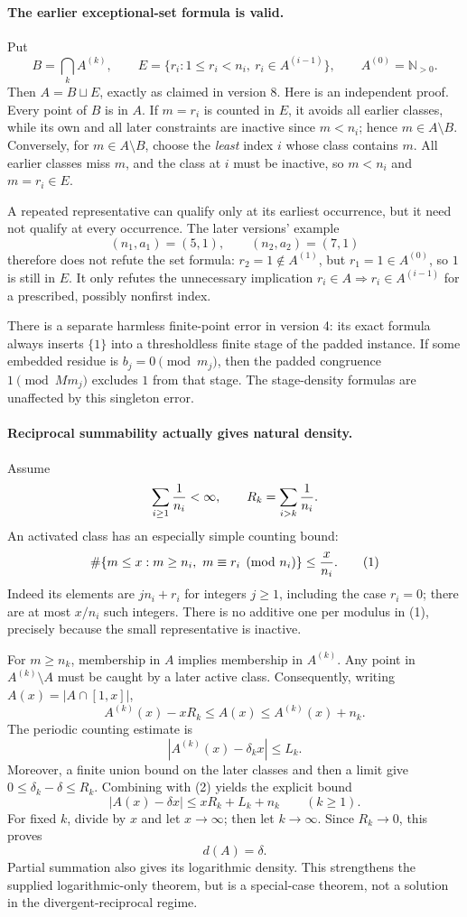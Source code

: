 \paragraph{The earlier exceptional-set formula is valid.}
Put
\[
 B=\bigcap_k A^{(k)},\qquad
 E=\{r_i:1\le r_i<n_i,\ r_i\in A^{(i-1)}\},\qquad A^{(0)}=\mathbb N_{>0}.
\]
Then $A=B\sqcup E$, exactly as claimed in version 8. Here is an independent proof. Every point of $B$ is in $A$. If $m=r_i$ is counted in $E$, it avoids all earlier classes, while its own and all later constraints are inactive since $m<n_i$; hence $m\in A\setminus B$. Conversely, for $m\in A\setminus B$, choose the \emph{least} index $i$ whose class contains $m$. All earlier classes miss $m$, and the class at $i$ must be inactive, so $m<n_i$ and $m=r_i\in E$.

A repeated representative can qualify only at its earliest occurrence, but it need not qualify at every occurrence. The later versions' example
\[
(n_1,a_1)=(5,1),\qquad(n_2,a_2)=(7,1)
\]
therefore does not refute the set formula: $r_2=1\notin A^{(1)}$, but $r_1=1\in A^{(0)}$, so $1$ is still in $E$. It only refutes the unnecessary implication $r_i\in A\Rightarrow r_i\in A^{(i-1)}$ for a prescribed, possibly nonfirst index.

There is a separate harmless finite-point error in version 4: its exact formula always inserts $\{1\}$ into a thresholdless finite stage of the padded instance. If some embedded residue is $b_j=0\pmod{m_j}$, then the padded congruence $1\pmod{Mm_j}$ excludes $1$ from that stage. The stage-density formulas are unaffected by this singleton error.

\paragraph{Reciprocal summability actually gives natural density.}
Assume
\[
 \sum_{i\ge1}{1\over n_i}<\infty,\qquad R_k=\sum_{i>k}{1\over n_i}.
\]
An activated class has an especially simple counting bound:
\[
\#\{m\le x:m\ge n_i,\ m\equiv r_i\pmod{n_i}\}
\le {x\over n_i}. \tag{1}
\]
Indeed its elements are $jn_i+r_i$ for integers $j\ge1$, including the case $r_i=0$; there are at most $x/n_i$ such integers. There is no additive one per modulus in (1), precisely because the small representative is inactive.

For $m\ge n_k$, membership in $A$ implies membership in $A^{(k)}$. Any point in $A^{(k)}\setminus A$ must be caught by a later active class. Consequently, writing $A(x)=|A\cap[1,x]|$,
\[
 A^{(k)}(x)-xR_k\le A(x)\le A^{(k)}(x)+n_k. \tag{2}
\]
The periodic counting estimate is
\[
 |A^{(k)}(x)-\delta_kx|\le L_k.
\]
Moreover, a finite union bound on the later classes and then a limit give $0\le\delta_k-\delta\le R_k$. Combining with (2) yields the explicit bound
\[
 \boxed{|A(x)-\delta x|\le xR_k+L_k+n_k\qquad(k\ge1).} \tag{3}
\]
For fixed $k$, divide by $x$ and let $x\to\infty$; then let $k\to\infty$. Since $R_k\to0$, this proves
\[
 \boxed{d(A)=\delta.}
\]
Partial summation also gives its logarithmic density. This strengthens the supplied logarithmic-only theorem, but is a special-case theorem, not a solution in the divergent-reciprocal regime.

